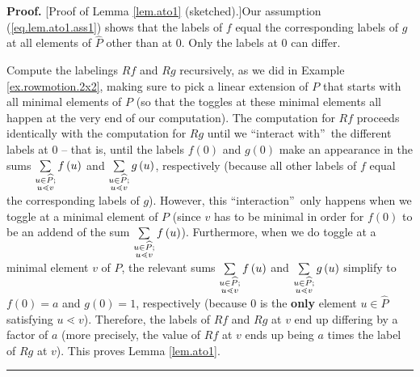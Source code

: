 \documentclass[numbers=enddot,12pt,final,onecolumn,notitlepage]{scrartcl}%
\theoremstyle{definition}
\newenvironment{vershort}{}{}
\newenvironment{proof}[1][Proof]{\noindent\textbf{#1.} }{\ \rule{0.5em}{0.5em}}
\let\sumnonlimits\sum
\renewcommand{\sum}{\sumnonlimits\limits}
\begin{document}
\begin{vershort}


\begin{proof}
[Proof of Lemma \ref{lem.ato1} (sketched).]Our assumption
(\ref{eq.lem.ato1.ass1}) shows that the labels of $f$ equal the corresponding
labels of $g$ at all elements of $\widehat{P}$ other than at $0$. Only the
labels at $0$ can differ.

Compute the labelings $Rf$ and $Rg$ recursively, as we did in Example
\ref{ex.rowmotion.2x2}, making sure to pick a linear extension of $P$ that
starts with all minimal elements of $P$ (so that the toggles at these minimal
elements all happen at the very end of our computation). The computation for
$Rf$ proceeds identically with the computation for $Rg$ until we
\textquotedblleft interact with\textquotedblright\ the different labels at $0$
-- that is, until the labels $f\left(  0\right)  $ and $g\left(  0\right)  $
make an appearance in the sums $\sum\limits_{\substack{u\in\widehat{P}%
;\\u\lessdot v}}f\left(  u\right)  $ and $\sum\limits_{\substack{u\in
\widehat{P};\\u\lessdot v}}g\left(  u\right)  $, respectively (because all
other labels of $f$ equal the corresponding labels of $g$). However, this
\textquotedblleft interaction\textquotedblright\ only happens when we toggle
at a minimal element of $P$ (since $v$ has to be minimal in order for
$f\left(  0\right)  $ to be an addend of the sum $\sum\limits_{\substack{u\in
\widehat{P};\\u\lessdot v}}f\left(  u\right)  $). Furthermore, when we do
toggle at a minimal element $v$ of $P$, the relevant sums $\sum
\limits_{\substack{u\in\widehat{P};\\u\lessdot v}}f\left(  u\right)  $ and
$\sum\limits_{\substack{u\in\widehat{P};\\u\lessdot v}}g\left(  u\right)  $
simplify to $f\left(  0\right)  =a$ and $g\left(  0\right)  =1$, respectively
(because $0$ is the \textbf{only} element $u\in\widehat{P}$ satisfying
$u\lessdot v$). Therefore, the labels of $Rf$ and $Rg$ at $v$ end up differing
by a factor of $a$ (more precisely, the value of $Rf$ at $v$ ends up being $a$
times the label of $Rg$ at $v$). This proves Lemma \ref{lem.ato1}.
\end{proof}
\end{vershort}
\end{document}
